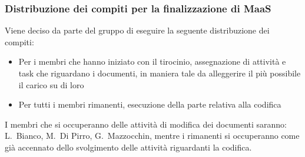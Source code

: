 \documentclass[11pt]{meetingmins}
\begin{document}
\subsubsection{Distribuzione dei compiti per la finalizzazione di MaaS}

Viene deciso da parte del gruppo di eseguire la seguente distribuzione dei compiti:
\begin{itemize}

\item Per i membri che hanno iniziato con il tirocinio, assegnazione di attività e task che riguardano i documenti, in maniera tale da alleggerire il più possibile il carico su di loro
\item Per tutti i membri rimanenti, esecuzione della parte relativa alla codifica
\end{itemize}

I membri che si occuperanno delle attività di modifica dei documenti saranno: L.~Bianco, M.~Di Pirro, G.~Mazzocchin, mentre i rimanenti si occuperanno come già accennato dello svolgimento delle attività riguardanti la codifica.


\end{document}
